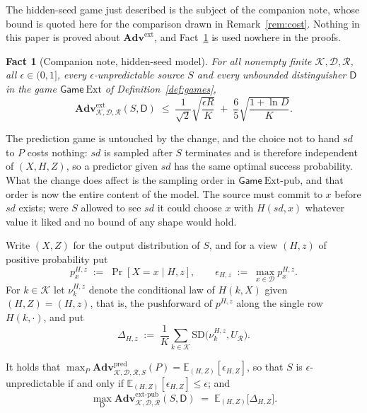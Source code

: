\documentclass{aicr-solution}
\newcommand{\Adv}{\mathbf{Adv}}
\newcommand{\Gm}{\mathsf{Game}}
\newcommand{\Ext}{\mathrm{Ext}}
\newcommand{\Extp}{\mathrm{Ext}\text{-}\mathrm{pub}}
\newcommand{\pred}{\mathrm{pred}}
\newcommand{\ext}{\mathrm{ext}}
\newcommand{\extp}{\mathrm{ext}\text{-}\mathrm{pub}}
\newcommand{\sd}{\mathit{sd}}
\newcommand{\SD}{\mathrm{SD}}
\newcommand{\calK}{\mathcal{K}}
\newcommand{\calD}{\mathcal{D}}
\newcommand{\calR}{\mathcal{R}}
\newtheorem{fact}{Fact}
\begin{document}
The hidden-seed game just described is the subject of the companion note, whose bound is quoted
here for the comparison drawn in Remark~\ref{rem:cost}. Nothing in this paper is proved about
$\Adv^{\ext}$, and Fact~\ref{fact:hidden} is used nowhere in the proofs.

\begin{fact}[Companion note, hidden-seed model]\label{fact:hidden}
For all nonempty finite $\calK, \calD, \calR$, all $\epsilon \in (0,1]$, every
$\epsilon$-unpredictable source $S$ and every unbounded distinguisher $\mathsf{D}$ in the game
$\Gm\ \Ext$ of Definition~\ref{def:games},
\[
  \Adv^{\ext}_{\calK,\calD,\calR}(S,\mathsf{D})
  \;\le\; \frac{1}{\sqrt{2}}\sqrt{\frac{\epsilon R}{K}}
       \;+\; \frac{6}{5}\sqrt{\frac{1 + \ln D}{K}} .
\]
\end{fact}

The prediction game is untouched by the change, and the choice not to hand $\sd$ to $P$ costs
nothing: $\sd$ is sampled after $S$ terminates and is therefore independent of $(X,H,Z)$, so a
predictor given $\sd$ has the same optimal success probability. What the change does affect is
the sampling order in $\Gm\ \Extp$, and that order is now the entire content of the model. The
source must commit to $x$ before $\sd$ exists; were $S$ allowed to see $\sd$ it could choose $x$
with $H(\sd,x)$ whatever value it liked and no bound of any shape would hold.

Write $(X,Z)$ for the output distribution of $S$, and for a view $(H,z)$ of positive probability put
\[
  p^{H,z}_{x} \;:=\; \Pr[X = x \mid H, z] ,
  \qquad
  \epsilon_{H,z} \;:=\; \max_{x \in \calD} p^{H,z}_{x} .
\]
For $k \in \calK$ let $\nu^{H,z}_{k}$ denote the conditional law of $H(k, X)$ given $(H,Z) = (H,z)$,
that is, the pushforward of $p^{H,z}$ along the single row $H(k,\cdot)$, and put
\[
  \Delta_{H,z} \;:=\; \frac{1}{K}\sum_{k \in \calK} \SD\bigl(\nu^{H,z}_{k}, U_{\calR}\bigr).
\]

\begin{lemma}\label{lem:analytic}
It holds that
$\max_{P} \Adv^{\pred}_{\calK,\calD,\calR,S}(P) = \mathbb{E}_{(H,Z)}[\epsilon_{H,Z}]$, so that
$S$ is $\epsilon$-unpredictable if and only if $\mathbb{E}_{(H,Z)}[\epsilon_{H,Z}] \le \epsilon$;
and
\begin{equation}\label{eq:analytic}
  \max_{\mathsf{D}}\Adv^{\extp}_{\calK,\calD,\calR}(S,\mathsf{D})
  \;=\; \mathbb{E}_{(H,Z)}\bigl[\Delta_{H,Z}\bigr] .
\end{equation}
\end{lemma}
\end{document}
